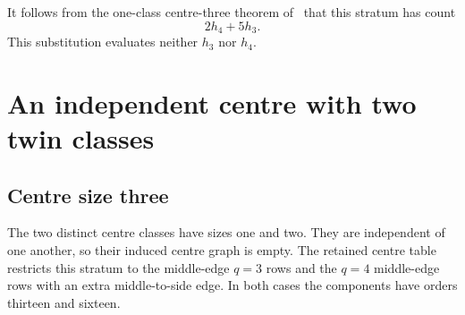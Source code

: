 \documentclass[11pt]{article}
\begin{document}
It follows from the one-class centre-three theorem of~\cite{halves} that
this stratum has count
\begin{equation}\label{oneclass3}
 2h_4+5h_3.
\end{equation}
This substitution evaluates neither $h_3$ nor $h_4$.

\section{An independent centre with two twin classes}

\subsection{Centre size three}

The two distinct centre classes have sizes one and two. They are
independent of one another, so their induced centre graph is empty.
The retained centre table restricts this stratum to the middle-edge
$q=3$ rows and the $q=4$ middle-edge rows with an extra middle-to-side
edge. In both cases the components have orders thirteen and sixteen.
\end{document}
